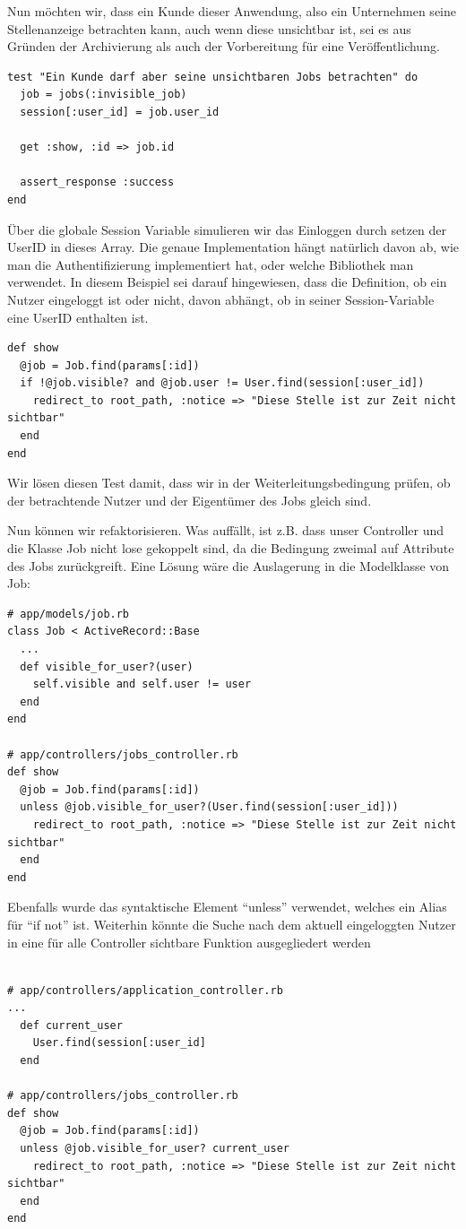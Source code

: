 Nun möchten wir, dass ein Kunde dieser Anwendung, also ein Unternehmen seine Stellenanzeige betrachten kann, auch wenn diese unsichtbar ist, sei es aus Gründen der Archivierung als auch der Vorbereitung für eine Veröffentlichung.

\begin{lstlisting}
test "Ein Kunde darf aber seine unsichtbaren Jobs betrachten" do
  job = jobs(:invisible_job)
  session[:user_id] = job.user_id
  
  get :show, :id => job.id

  assert_response :success
end
\end{lstlisting}
\tddred
Über die globale Session Variable simulieren wir das Einloggen durch setzen der UserID in dieses Array. Die genaue Implementation hängt natürlich davon ab, wie man die Authentifizierung implementiert hat, oder welche Bibliothek man verwendet. In diesem Beispiel sei darauf hingewiesen, dass die Definition, ob ein Nutzer eingeloggt ist oder nicht, davon abhängt, ob in seiner Session-Variable eine UserID enthalten ist.

\begin{lstlisting}
def show
  @job = Job.find(params[:id])
  if !@job.visible? and @job.user != User.find(session[:user_id])
    redirect_to root_path, :notice => "Diese Stelle ist zur Zeit nicht sichtbar"
  end
end
\end{lstlisting}
\tddgreen
Wir lösen diesen Test damit, dass wir in der Weiterleitungsbedingung prüfen, ob der betrachtende Nutzer und der Eigentümer des Jobs gleich sind.

Nun können wir refaktorisieren. Was auffällt, ist z.B. dass unser Controller und die Klasse Job nicht lose gekoppelt sind, da die Bedingung zweimal auf Attribute des Jobs zurückgreift. Eine Lösung wäre die Auslagerung in die Modelklasse von Job:
\tddrefactor
\begin{lstlisting}
# app/models/job.rb
class Job < ActiveRecord::Base
  ...
  def visible_for_user?(user)
    self.visible and self.user != user
  end 
end

# app/controllers/jobs_controller.rb 
def show
  @job = Job.find(params[:id])
  unless @job.visible_for_user?(User.find(session[:user_id]))
    redirect_to root_path, :notice => "Diese Stelle ist zur Zeit nicht sichtbar"
  end
end
\end{lstlisting}
Ebenfalls wurde das syntaktische Element "`unless"' verwendet, welches ein Alias für "`if not"' ist.
Weiterhin könnte die Suche nach dem aktuell eingeloggten Nutzer in eine für alle Controller sichtbare Funktion ausgegliedert werden
\tddrefactor
\begin{lstlisting}

# app/controllers/application_controller.rb
...
  def current_user
    User.find(session[:user_id]
  end

# app/controllers/jobs_controller.rb 
def show
  @job = Job.find(params[:id])
  unless @job.visible_for_user? current_user
    redirect_to root_path, :notice => "Diese Stelle ist zur Zeit nicht sichtbar"
  end
end
\end{lstlisting}


